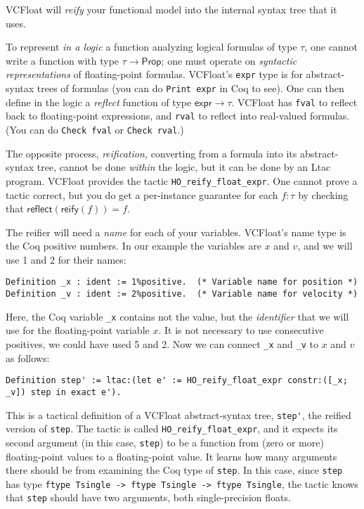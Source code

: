 \documentclass[article]{memoir}
\begin{document}
VCFloat will \emph{reify} your functional model into the internal
syntax tree that it uses.

To represent \emph{in a logic} a function analyzing logical formulas
of type $\tau$, one cannot write a function with type $\tau\rightarrow
\mathsf{Prop}$; one must operate on \emph{syntactic
representations} of floating-point formulas.
VCFloat's \lstinline{expr} type is for abstract-syntax trees of
formulas (you can do \lstinline{Print expr} in Coq to see).
One can then define in the logic a 
\emph{reflect} function of type $\mathsf{expr}\rightarrow \tau$.
VCFloat has \lstinline{fval} to reflect back to floating-point
expressions, and \lstinline{rval} to reflect into real-valued formulas.
(You can do \lstinline{Check fval} or \lstinline{Check rval}.)

The opposite process, \emph{reification,} converting
from a formula into its abstract-syntax tree, 
cannot be done \emph{within} the logic, but it can be done
by an Ltac program.  VCFloat provides
the tactic \lstinline{HO_reify_float_expr}.
One cannot prove a tactic correct, but
you do get a per-instance guarantee
for each $f:\tau$ by checking that $\mathsf{reflect}(\mathsf{reify}(f))=f$.

The reifier will need
a \emph{name} for each of your variables.
VCFloat's name type is the Coq positive numbers.
In our example the variables are $x$ and $v$, and
we will use 1 and 2 for their names:

\begin{lstlisting}
Definition _x : ident := 1%positive.  (* Variable name for position *)
Definition _v : ident := 2%positive.  (* Variable name for velocity *)
\end{lstlisting}

Here, the Coq variable \lstinline{_x} contains not the value,
but the \emph{identifier} that we will use for the floating-point
variable $x$.  It is not necessary to use consecutive positives,
we could have used 5 and 2.
Now we can connect \lstinline{_x} and
\lstinline{_v} to $x$ and $v$ as follows:

\begin{lstlisting}
Definition step' := ltac:(let e' := HO_reify_float_expr constr:([_x; _v]) step in exact e').
\end{lstlisting}

This is a tactical definition of a VCFloat abstract-syntax tree,
\lstinline{step'}, the reified version of \lstinline{step}.
The tactic is called \lstinline{HO_reify_float_expr},
and it expects its second argument (in this case, \lstinline{step})
to be a function from (zero or more) floating-point values
to a floating-point value.  It learns how many arguments
there should be from examining the Coq type of \lstinline{step}.
In this case, since \lstinline{step} has type
\lstinline{ftype Tsingle -> ftype Tsingle -> ftype Tsingle},
the tactic knows that \lstinline{step} should have
two arguments, both single-precision floats.
\end{document}

